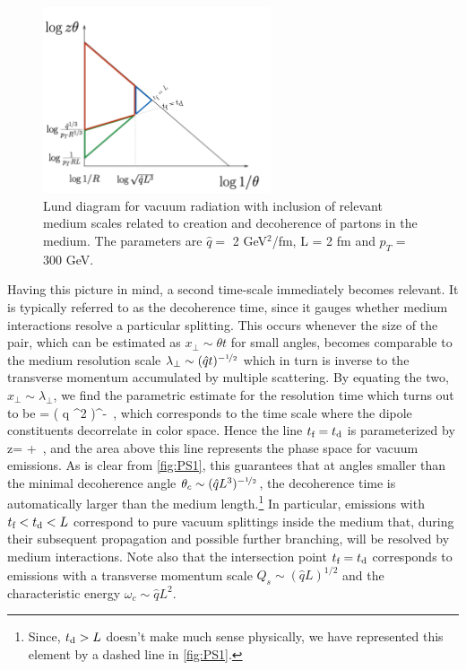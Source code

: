 \begin{figure}
\centering
\includegraphics[width=0.6\textwidth]{figures/kinematics/lund_regions_colored}%
\caption{Lund diagram for vacuum radiation with inclusion of relevant medium scales related to creation and decoherence of partons in the medium. The parameters are $\hat q = $ 2 GeV$^2$/fm, L = 2 fm and $p_{\scriptscriptstyle T}$ = 300 GeV. 
}
\label{fig:PS1}
\end{figure}
Having this picture in mind, a second time-scale immediately becomes relevant. It is typically referred to as the decoherence time, since it gauges whether medium interactions resolve a particular splitting. This occurs whenever the size of the pair, which can be estimated as $x_\perp \sim \theta t$ for small angles, becomes comparable to the medium resolution scale $\lambda_\perp \sim(\hat q t)^{-{\nicefrac{1}{2}}}$ which in turn is inverse to the transverse momentum accumulated by multiple scattering.
By equating the two, $x_\perp \sim \lambda_\perp$, we find the parametric estimate for the resolution time which turns out to be
\beq
\label{eq:DecoherenceTime}
\tdecoh = \left( \hat q \theta^2 \right)^{-\onethird} \,,
\eeq
which corresponds to the time scale where the dipole constituents decorrelate in color space.
Hence the line $t_\text{f} = t_\text{d}$ is parameterized by
\beq
\log z\theta =  \log {} + \log {} \,,
\eeq
and the area above this line represents the phase space for vacuum emissions.
As is clear from \autoref{fig:PS1}, this guarantees that at angles smaller than the minimal decoherence angle $\theta_c \sim (\hat q L^3)^{-{\nicefrac{1}{2}}}$, the decoherence time is automatically larger than the medium length.\footnote{Since, $t_\text{d} >L$ doesn't make much sense physically, we have represented this element by a dashed line in \autoref{fig:PS1}.} In particular, emissions with $t_\text{f}< t_\text{d} < L$ correspond to pure vacuum splittings inside the medium that, during their subsequent propagation and possible further branching, will be resolved by medium interactions. Note also that the intersection point $t_\text{f} = t_\text{d}$ corresponds to emissions with a transverse momentum scale $Q_s \sim(\hat q L)^{1/2}$ and the characteristic energy $\omega_c \sim \hat q L^2$.
